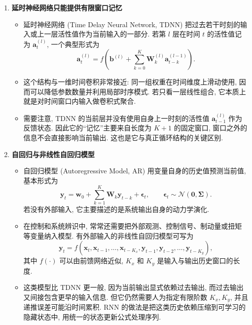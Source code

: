 \documentclass{../nndlcourse}
\begin{document}
\begin{enumerate}
  \item \textbf{延时神经网络只能提供有限窗口记忆}
    \begin{itemize}
      \item 延时神经网络 (Time Delay Neural Network, TDNN) 把过去若干时刻的输入或上一层活性值作为当前输入的一部分. 若第 $l$ 层在时间 $t$ 的活性值记为 $\boldsymbol{a}^{(l)}_t$, 一个典型形式为
      \begin{equation*}
        \boldsymbol{a}^{(l)}_t
        = f\left(
            \boldsymbol{b}^{(l)} + \sum_{k=0}^{K} \boldsymbol{W}^{(l)}_k \boldsymbol{a}^{(l-1)}_{t-k}
          \right).
      \end{equation*}
      \item 这个结构与一维时间卷积非常接近: 同一组权重在时间维度上滑动使用, 因而可以降低参数数量并利用局部时序模式. 若只看一层线性组合, 它本质上就是对时间窗口内输入做卷积式聚合.
      \item 需要注意, TDNN 的当前层并没有使用自身上一时刻的活性值 $\boldsymbol{a}^{(l)}_{t-1}$ 作为反馈状态. 因此它的“记忆”主要来自长度为 $K+1$ 的固定窗口, 窗口之外的信息不会直接影响当前输出. 这也是它与真正循环结构的关键区别.
    \end{itemize}

  \item \textbf{自回归与非线性自回归模型}
    \begin{itemize}
      \item 自回归模型 (Autoregressive Model, AR) 用变量自身的历史值预测当前值, 基本形式为
      \begin{equation*}
        \boldsymbol{y}_t = \boldsymbol{w}_0 + \sum_{k=1}^{K} \boldsymbol{W}_k \boldsymbol{y}_{t-k} + \boldsymbol{\epsilon}_t,
        \qquad
        \boldsymbol{\epsilon}_t \sim \mathcal{N}(\boldsymbol{0}, \boldsymbol{\Sigma}).
      \end{equation*}
      若没有外部输入, 它主要描述的是系统输出自身的动力学演化.
      \item 在控制和系统辨识中, 常常还需要把外部观测、控制信号、制动量或扭矩等变量纳入模型. 有外部输入的非线性自回归模型可写为
      \begin{equation*}
        \boldsymbol{y}_t =
        f\left(
          \boldsymbol{x}_t, \boldsymbol{x}_{t-1}, \ldots, \boldsymbol{x}_{t-K_x},
          \boldsymbol{y}_{t-1}, \boldsymbol{y}_{t-2}, \ldots, \boldsymbol{y}_{t-K_y}
        \right),
      \end{equation*}
      其中 $f(\cdot)$ 可以由前馈网络近似, $K_x$ 和 $K_y$ 是输入与输出历史窗口的长度.
      \item 这类模型比 TDNN 更一般, 因为当前输出显式依赖过去输出, 而过去输出又间接包含更早的输入信息. 但它仍然需要人为指定有限阶数 $K_x,K_y$, 并且递推误差可能沿时间累积. RNN 的做法是把这类历史依赖压缩到可学习的隐藏状态中, 用统一的状态更新公式处理序列.
    \end{itemize}
\end{enumerate}
\end{document}
